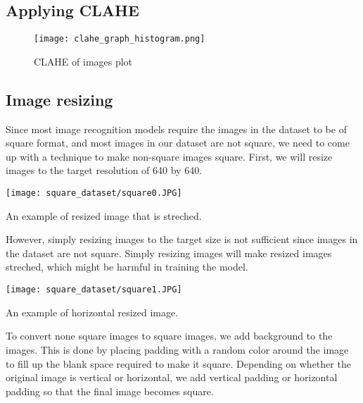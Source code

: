\subsection{Applying CLAHE}
\begin{figure}[H] %
	\texttt{[image: clahe\_graph\_histogram.png]}
	\caption{CLAHE of images plot}
	\label{fig:clahe_graph_histogram} %
\end{figure}

\newpage
\subsection{Image resizing}
Since most image recognition models require the images in the dataset to be of square format, and most images in our dataset are not square, we need to come up with a technique to make non-square images square. First, we will resize images to the target resolution of 640 by 640.
\begin{marginfigure} %
	\texttt{[image: square\_dataset/square0.JPG]}
	\caption{An example of resized image that is streched.}
\end{marginfigure}

However, simply resizing images to the target size is not sufficient since images in the dataset are not square. Simply resizing images will make resized images streched, which might be harmful in training the model.

\begin{marginfigure} %
	\texttt{[image: square\_dataset/square1.JPG]}
	\caption{An example of horizontal resized image.}
\end{marginfigure}

To convert none square images to square images, we add background to the images. This is done by placing padding with a random color around the image to fill up the blank space required to make it square.
Depending on whether the original image is vertical or horizontal, we add vertical padding or horizontal padding so that the final image becomes square.


